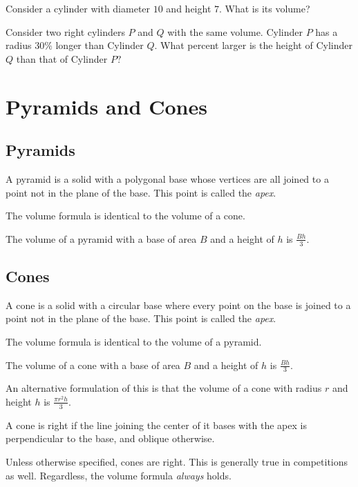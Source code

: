 \documentclass[mast]{lucky}
\begin{document}
\begin{exer}
Consider a cylinder with diameter $10$ and height $7.$ What is its volume?
\end{exer}
\begin{exer}
Consider two right cylinders $P$ and $Q$ with the same volume. Cylinder $P$ has a radius $30\%$ longer than Cylinder $Q.$ What percent larger is the height of Cylinder $Q$ than that of Cylinder $P?$
\end{exer}


\section{Pyramids and Cones}

\subsection{Pyramids}
\begin{defi}
A pyramid is a solid with a polygonal base whose vertices are all joined to a point not in the plane of the base. This point is called the \textit{apex}.
\end{defi}

The volume formula is identical to the volume of a cone.

\begin{theo}
The volume of a pyramid with a base of area $B$ and a height of $h$ is $\frac{Bh}{3}.$
\end{theo}

\subsection{Cones}
\begin{defi}
A cone is a solid with a circular base where every point on the base is joined to a point not in the plane of the base. This point is called the \textit{apex}.
\end{defi}

The volume formula is identical to the volume of a pyramid.

\begin{theo}
The volume of a cone with a base of area $B$ and a height of $h$ is $\frac{Bh}{3}.$
\end{theo}
An alternative formulation of this is that the volume of a cone with radius $r$ and height $h$ is $\frac{\pi r^2h}{3}.$

\begin{defi}
A cone is right if the line joining the center of it bases with the apex is perpendicular to the base, and oblique otherwise.
\end{defi}
Unless otherwise specified, cones are right. This is generally true in competitions as well. Regardless, the volume formula \textit{always} holds.
\end{document}
